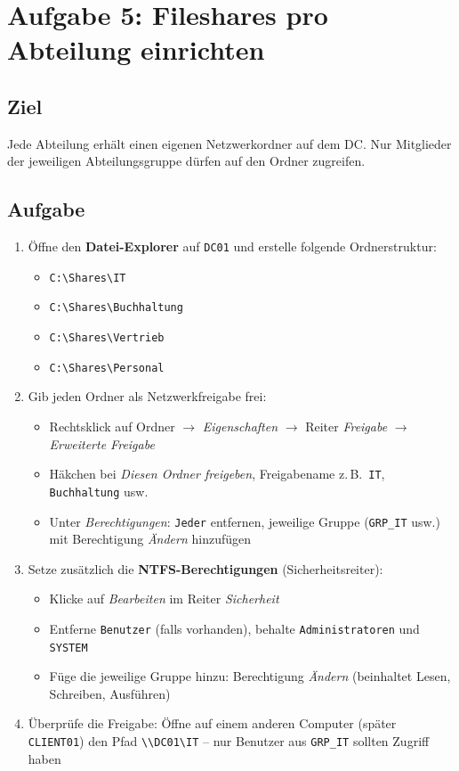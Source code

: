 \documentclass[11pt, oneside, numbers=noenddot]{scrbook}
\begin{document}
\newpage
\section{Aufgabe 5: Fileshares pro Abteilung einrichten}

\subsection*{Ziel}
Jede Abteilung erhält einen eigenen Netzwerkordner auf dem DC. Nur Mitglieder der jeweiligen Abteilungsgruppe dürfen auf den Ordner zugreifen.

\subsection*{Aufgabe}
\begin{enumerate}
  \item Öffne den \textbf{Datei-Explorer} auf \texttt{DC01} und erstelle folgende Ordnerstruktur:
  \begin{itemize}
    \item \texttt{C:\textbackslash Shares\textbackslash IT}
    \item \texttt{C:\textbackslash Shares\textbackslash Buchhaltung}
    \item \texttt{C:\textbackslash Shares\textbackslash Vertrieb}
    \item \texttt{C:\textbackslash Shares\textbackslash Personal}
  \end{itemize}
  \item Gib jeden Ordner als Netzwerkfreigabe frei:
  \begin{itemize}
    \item Rechtsklick auf Ordner $\rightarrow$ \textit{Eigenschaften} $\rightarrow$ Reiter \textit{Freigabe} $\rightarrow$ \textit{Erweiterte Freigabe}
    \item Häkchen bei \textit{Diesen Ordner freigeben}, Freigabename z.\,B.\ \texttt{IT}, \texttt{Buchhaltung} usw.
    \item Unter \textit{Berechtigungen}: \texttt{Jeder} entfernen, jeweilige Gruppe (\texttt{GRP\_IT} usw.) mit Berechtigung \textit{Ändern} hinzufügen
  \end{itemize}
  \item Setze zusätzlich die \textbf{NTFS-Berechtigungen} (Sicherheitsreiter):
  \begin{itemize}
    \item Klicke auf \textit{Bearbeiten} im Reiter \textit{Sicherheit}
    \item Entferne \texttt{Benutzer} (falls vorhanden), behalte \texttt{Administratoren} und \texttt{SYSTEM}
    \item Füge die jeweilige Gruppe hinzu: Berechtigung \textit{Ändern} (beinhaltet Lesen, Schreiben, Ausführen)
  \end{itemize}
  \item Überprüfe die Freigabe: Öffne auf einem anderen Computer (später \texttt{CLIENT01}) den Pfad \texttt{\textbackslash\textbackslash DC01\textbackslash IT} -- nur Benutzer aus \texttt{GRP\_IT} sollten Zugriff haben
\end{enumerate}
\end{document}

